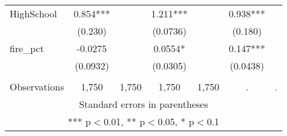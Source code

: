 \begin{tabular}{lcccccc}
HighSchool & 0.854*** &  & 1.211*** &  & 0.938*** &  \\
 & (0.230) &  & (0.0736) &  & (0.180) &  \\
fire\_pct & -0.0275 &  & 0.0554* &  & 0.147*** &  \\
 & (0.0932) &  & (0.0305) &  & (0.0438) &  \\
 &  &  &  &  &  &  \\
 Observations & 1,750 & 1,750 & 1,750 & 1,750 & . & . \\ \hline
\multicolumn{7}{c}{ Standard errors in parentheses} \\
\multicolumn{7}{c}{ *** p$<$0.01, ** p$<$0.05, * p$<$0.1} \\
\end{tabular}
